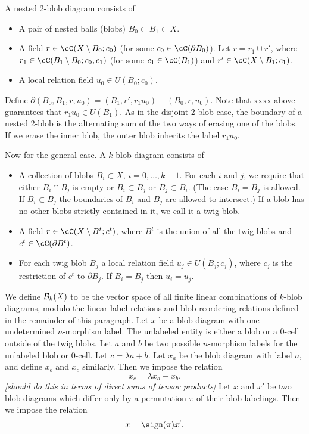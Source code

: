 \documentclass[11pt,leqno]{article}
\def\bc{{\cal B}}
\def\bd{\partial}
\def\sub{\subset}
\def\setmin{\setminus}
\def\nn#1{{{\it \small [#1]}}}
\newcommand{\eq}[1]{\begin{displaymath}#1\end{displaymath}}
\begin{document}
A nested 2-blob diagram consists of
\begin{itemize}
\item A pair of nested balls (blobs) $B_0 \sub B_1 \sub X$.
\item A field $r \in \cC(X \setmin B_0; c_0)$
(for some $c_0 \in \cC(\bd B_0)$).
Let $r = r_1 \cup r'$, where $r_1 \in \cC(B_1 \setmin B_0; c_0, c_1)$
(for some $c_1 \in \cC(B_1)$) and
$r' \in \cC(X \setmin B_1; c_1)$.
\item A local relation field $u_0 \in U(B_0; c_0)$.
\end{itemize}
Define $\bd(B_0, B_1, r, u_0) = (B_1, r', r_1u_0) - (B_0, r, u_0)$.
Note that xxxx above guarantees that $r_1u_0 \in U(B_1)$.
As in the disjoint 2-blob case, the boundary of a nested 2-blob is the alternating
sum of the two ways of erasing one of the blobs.
If we erase the inner blob, the outer blob inherits the label $r_1u_0$.

Now for the general case.
A $k$-blob diagram consists of
\begin{itemize}
\item A collection of blobs $B_i \sub X$, $i = 0, \ldots, k-1$.
For each $i$ and $j$, we require that either $B_i \cap B_j$ is empty or
$B_i \sub B_j$ or $B_j \sub B_i$.
(The case $B_i = B_j$ is allowed.
If $B_i \sub B_j$ the boundaries of $B_i$ and $B_j$ are allowed to intersect.)
If a blob has no other blobs strictly contained in it, we call it a twig blob.
\item A field $r \in \cC(X \setmin B^t; c^t)$,
where $B^t$ is the union of all the twig blobs and $c^t \in \cC(\bd B^t)$.
\item For each twig blob $B_j$ a local relation field $u_j \in U(B_j; c_j)$,
where $c_j$ is the restriction of $c^t$ to $\bd B_j$.
If $B_i = B_j$ then $u_i = u_j$.
\end{itemize}

We define $\bc_k(X)$ to be the vector space of all finite linear combinations
of $k$-blob diagrams, modulo the linear label relations and
blob reordering relations defined in the remainder of this paragraph.
Let $x$ be a blob diagram with one undetermined $n$-morphism label.
The unlabeled entity is either a blob or a 0-cell outside of the twig blobs.
Let $a$ and $b$ be two possible $n$-morphism labels for
the unlabeled blob or 0-cell.
Let $c = \lambda a + b$.
Let $x_a$ be the blob diagram with label $a$, and define $x_b$ and $x_c$ similarly.
Then we impose the relation
\eq{
	x_c = \lambda x_a + x_b .
}
\nn{should do this in terms of direct sums of tensor products}
Let $x$ and $x'$ be two blob diagrams which differ only by a permutation $\pi$
of their blob labelings.
Then we impose the relation
\eq{
	x = \sign(\pi) x' .
}
\end{document}
